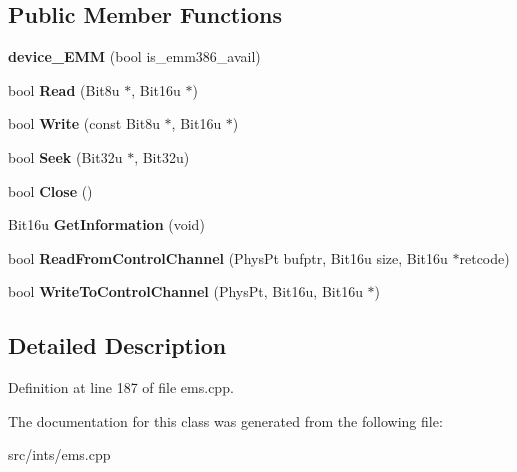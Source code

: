 \subsection*{Public Member Functions}
\begin{DoxyCompactItemize}
\item 
\hypertarget{classdevice__EMM_abe0c07b3c8989251c2c86b710ab83217}{{\bfseries device\-\_\-\-E\-M\-M} (bool is\-\_\-emm386\-\_\-avail)}\label{classdevice__EMM_abe0c07b3c8989251c2c86b710ab83217}

\item 
\hypertarget{classdevice__EMM_a6c62e1a0b8556bf0421d2c4de6eb0e25}{bool {\bfseries Read} (Bit8u $\ast$, Bit16u $\ast$)}\label{classdevice__EMM_a6c62e1a0b8556bf0421d2c4de6eb0e25}

\item 
\hypertarget{classdevice__EMM_a7c0ce70b4f8bc621a5569e30c2abd3d1}{bool {\bfseries Write} (const Bit8u $\ast$, Bit16u $\ast$)}\label{classdevice__EMM_a7c0ce70b4f8bc621a5569e30c2abd3d1}

\item 
\hypertarget{classdevice__EMM_adb3ac540c49174fb7fcc58dcd0d8d91e}{bool {\bfseries Seek} (Bit32u $\ast$, Bit32u)}\label{classdevice__EMM_adb3ac540c49174fb7fcc58dcd0d8d91e}

\item 
\hypertarget{classdevice__EMM_a86c23d668635587cda864ce3d6def05d}{bool {\bfseries Close} ()}\label{classdevice__EMM_a86c23d668635587cda864ce3d6def05d}

\item 
\hypertarget{classdevice__EMM_a08750d12358cc26010295c24066caaac}{Bit16u {\bfseries Get\-Information} (void)}\label{classdevice__EMM_a08750d12358cc26010295c24066caaac}

\item 
\hypertarget{classdevice__EMM_ae6da9c47ea49efe899b779f6ccff23d9}{bool {\bfseries Read\-From\-Control\-Channel} (Phys\-Pt bufptr, Bit16u size, Bit16u $\ast$retcode)}\label{classdevice__EMM_ae6da9c47ea49efe899b779f6ccff23d9}

\item 
\hypertarget{classdevice__EMM_a08952bf66d9a65a44dd399dac20e3895}{bool {\bfseries Write\-To\-Control\-Channel} (Phys\-Pt, Bit16u, Bit16u $\ast$)}\label{classdevice__EMM_a08952bf66d9a65a44dd399dac20e3895}

\end{DoxyCompactItemize}


\subsection{Detailed Description}


Definition at line 187 of file ems.\-cpp.



The documentation for this class was generated from the following file\-:\begin{DoxyCompactItemize}
\item 
src/ints/ems.\-cpp\end{DoxyCompactItemize}
